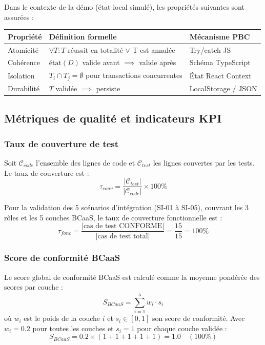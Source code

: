 \documentclass[12pt,a4paper]{report}
\begin{document}
Dans le contexte de la démo (état local simulé), les propriétés suivantes sont assurées :

\begin{center}
\renewcommand{\arraystretch}{1.4}
\begin{tabular}{lll}
\toprule
\textbf{Propriété} & \textbf{Définition formelle} & \textbf{Mécanisme PBC} \\
\midrule
Atomicité    & $\forall T : T$ réussit en totalité $\lor$ T est annulée & Try/catch JS \\
Cohérence    & $\text{état}(D)$ valide avant $\implies$ valide après & Schéma TypeScript \\
Isolation    & $T_i \cap T_j = \emptyset$ pour transactions concurrentes & État React Context \\
Durabilité   & $T$ validée $\implies$ persiste & LocalStorage / JSON \\
\bottomrule
\end{tabular}
\end{center}

\subsection{Métriques de qualité et indicateurs KPI}

\subsubsection*{Taux de couverture de test}

Soit $\mathcal{C}_{code}$ l'ensemble des lignes de code et $\mathcal{C}_{test}$ les lignes couvertes
par les tests. Le taux de couverture est :
\[
\tau_{couv} = \frac{|\mathcal{C}_{test}|}{|\mathcal{C}_{code}|} \times 100\%
\]

Pour la validation des 5 scénarios d'intégration (SI-01 à SI-05), couvrant les 3 rôles
et les 5 couches BCaaS, le taux de couverture fonctionnelle est :
\[
\tau_{fonc} = \frac{|\text{cas de test CONFORME}|}{|\text{cas de test total}|} = \frac{15}{15} = 100\%
\]

\subsubsection*{Score de conformité BCaaS}

Le score global de conformité BCaaS est calculé comme la moyenne pondérée des
scores par couche :
\[
S_{BCaaS} = \sum_{i=1}^{5} w_i \cdot s_i
\]
où $w_i$ est le poids de la couche $i$ et $s_i \in [0, 1]$ son score de conformité.
Avec $w_i = 0.2$ pour toutes les couches et $s_i = 1$ pour chaque couche validée :
\[
S_{BCaaS} = 0.2 \times (1 + 1 + 1 + 1 + 1) = 1.0 \quad (100\%)
\]
\end{document}
